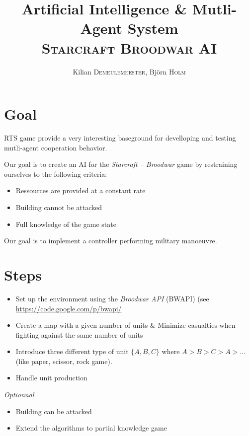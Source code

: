 \documentclass[a4paper,9pt]{extarticle}
\title{Artificial Intelligence \& Mutli-Agent System \\ \textsc{Starcraft Broodwar AI}}
\author{Kilian \textsc{Demeulemeester}, Björn \textsc{Holm}}
\begin{document}
\maketitle

\section*{Goal}

RTS game provide a very interesting baseground for develloping and testing mutli-agent cooperation behavior. 

Our goal is to create an AI for the \emph{Starcraft -- Broodwar} game by restraining ourselves to the following criteria:
\begin{itemize}
    \item Ressources are provided at a constant rate
    \item Building cannot be attacked
    \item Full knowledge of the game state
\end{itemize}

Our goal is to implement a controller performing military manoeuvre.

\section*{Steps}

\begin{itemize}
    \item Set up the environment using the \emph{Broodwar API} (BWAPI) (see \url{https://code.google.com/p/bwapi/}
    \item Create a map with a given number of units \& Minimize casualties when fighting against the same number of units 

    \item Introduce three different type of unit $\{A,B,C\}$ where $A > B > C > A > ...$ (like paper, scissor, rock game).
    \item Handle unit production
\end{itemize}

\emph{Optionnal}
\begin{itemize}
    \item Building can be attacked
    \item Extend the algorithms to partial knowledge game 
\end{itemize}
\end{document}
